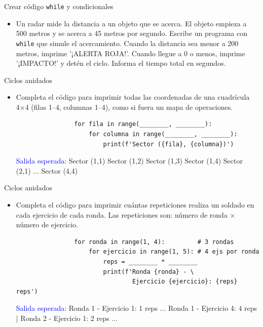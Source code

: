 \documentclass{beamer}
\begin{document}
    \begin{frame}{Crear código \texttt{while} y condicionales}
        \begin{itemize}
            \item Un radar mide la distancia a un objeto que se acerca. El objeto empieza a 500 metros y se acerca a 45 metros por segundo. Escribe un programa con \texttt{while} que simule el acercamiento. Cuando la distancia sea menor a 200 metros, imprime '¡ALERTA ROJA!'. Cuando llegue a 0 o menos, imprime '¡IMPACTO!' y detén el ciclo. Informa el tiempo total en segundos.
        \end{itemize}
    \end{frame}

    \begin{frame}[fragile, t]{Ciclos anidados}
        \begin{itemize}
            \item Completa el código para imprimir todas las coordenadas de una cuadrícula 4×4 (filas 1–4, columnas 1–4), como si fuera un mapa de operaciones.
            \begin{verbatim}
                for fila in range(________, ________):
                    for columna in range(________, ________):
                        print(f'Sector ({fila}, {columna})')
            \end{verbatim}
            \textcolor{blue}{Salida esperada}: Sector (1,1)  Sector (1,2)  Sector (1,3)  Sector (1,4)  Sector (2,1) ...  Sector (4,4)
        \end{itemize}
    \end{frame}

    \begin{frame}[fragile, t]{Ciclos anidados}
        \begin{itemize}
            \item Completa el código para imprimir cuántas repeticiones realiza un soldado en cada ejercicio de cada ronda. Las repeticiones son: número de ronda × número de ejercicio.
            \begin{verbatim}
                for ronda in range(1, 4):         # 3 rondas
                    for ejercicio in range(1, 5): # 4 ejs por ronda
                        reps = ________ * ________
                        print(f'Ronda {ronda} - \ 
                                Ejercicio {ejercicio}: {reps} reps')
            \end{verbatim}
            \textcolor{blue}{Salida esperada}: Ronda 1 - Ejercicio 1: 1 reps  ...  Ronda 1 - Ejercicio 4: 4 reps  |  Ronda 2 - Ejercicio 1: 2 reps  ...
        \end{itemize}
    \end{frame}
\end{document}
